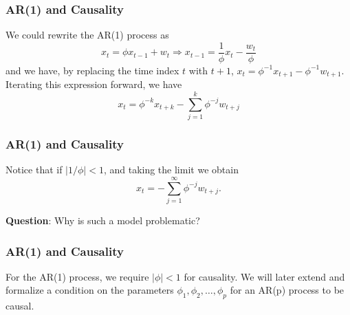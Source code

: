 \documentclass[%
xcolor=pdftex]{beamer}
\begin{document}
\begin{frame}
\frametitle{AR(1) and Causality}

We could rewrite the AR(1) process as
 $$
 x_t=\phi x_{t-1} + w_t  \Rightarrow x_{t-1} = \frac{1}{\phi} x_t - \frac{w_t}{\phi}
 $$
 and we have, by replacing the time index $t$ with $t+1$, $x_t =\phi^{-1} x_{t+1} - \phi^{-1} w_{t+1}$. Iterating this expression
forward, we have
 $$
 x_t=\phi^{-k} x_{t+k}-\sum_{j=1}^{k} \phi^{-j} w_{t+j}
 $$


\end{frame}

\begin{frame}
\frametitle{AR(1) and Causality}

Notice that if $|1/\phi|<1$, and taking the limit we obtain
 $$
 x_t=-\sum_{j=1}^{\infty} \phi^{-j} w_{t+j}.
 $$


\textbf{Question}: Why is such a model problematic?


\end{frame}

\begin{frame}
\frametitle{AR(1) and Causality}

For the AR(1) process, we require $|\phi|<1$ for causality. We will later extend and formalize a condition on the parameters $\phi_1, \phi_2, \ldots, \phi_p$ for an AR(p) process to be causal.


\end{frame}
\end{document}
